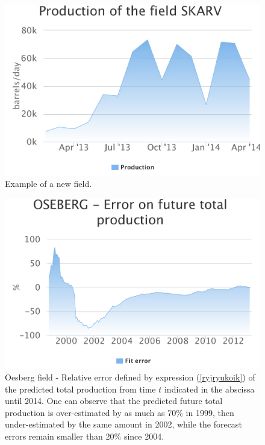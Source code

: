\documentclass[review]{elsarticle}
\begin{document}
\noindent 
\begin{figure}[H]
\includegraphics[width=1\columnwidth]{skarv}
\caption{Example of a new field.}
\label{new} 
\end{figure}


\noindent 
\begin{figure}[H]
\includegraphics[width=1\columnwidth]{oesberg-error}
\caption{Oesberg field - Relative error defined by expression (\ref{ryjryukoik})
of the predicted total production from time $t$ indicated in the abscissa until 2014.
One can observe that the predicted future total production is over-estimated by as much
as 70\% in 1999, then under-estimated by the same amount in 2002, while the forecast
errors remain smaller than 20\% since 2004.}
\label{oesberg-error}
\end{figure}
\end{document}

